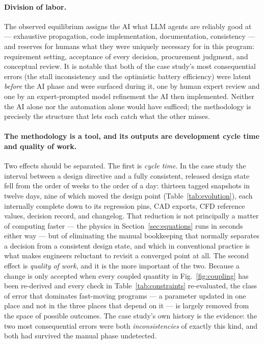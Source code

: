\paragraph{Division of labor.} The observed equilibrium assigns the
AI what LLM agents are reliably good at --- exhaustive propagation,
code implementation, documentation, consistency --- and reserves for
humans what they were uniquely necessary for in this program:
requirement setting, acceptance of every decision, procurement
judgment, and conceptual review. It is notable that both of the case
study's most consequential errors (the stall inconsistency and the
optimistic battery efficiency) were latent \emph{before} the AI phase
and were surfaced during it, one by human expert review and one by an
expert-prompted model refinement the AI then implemented. Neither the
AI alone nor the automation alone would have sufficed; the methodology
is precisely the structure that lets each catch what the other misses.

\paragraph{The methodology is a tool, and its outputs are development
cycle time and quality of work.} Two effects should be separated. The
first is \emph{cycle time}. In the case study the interval between a
design directive and a fully consistent, released design state fell
from the order of weeks to the order of a day: thirteen tagged
snapshots in twelve days, nine of which moved the design point
(Table~\ref{tab:evolution}), each internally complete down to its
regression pins, CAD exports, CFD reference values, decision record,
and changelog. That reduction is not
principally a matter of computing faster --- the physics in
Section~\ref{sec:equations} runs in seconds either way --- but of
eliminating the manual bookkeeping that normally separates a decision
from a consistent design state, and which in conventional practice is
what makes engineers reluctant to revisit a converged point at all. The
second effect is \emph{quality of work}, and it is the more important
of the two. Because a change is only accepted when every coupled
quantity in Fig.~\ref{fig:coupling} has been re-derived and every check
in Table~\ref{tab:constraints} re-evaluated, the class of error that
dominates fast-moving programs --- a parameter updated in one place and
not in the three places that depend on it --- is largely removed from
the space of possible outcomes. The case study's own history is the
evidence: the two most consequential errors were both
\emph{inconsistencies} of exactly this kind, and both had survived the
manual phase undetected.

